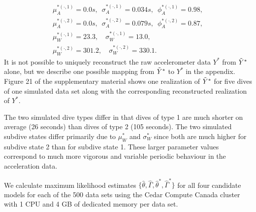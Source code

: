 %
\begin{gather*}
    \mu_A^{*(\cdot,1)} = 0.0 s, \enspace \sigma_A^{*(\cdot,1)} = 0.034s, \enspace \phi_A^{*(\cdot,1)} = 0.98, \\
    \mu_A^{*(\cdot,2)} = 0.0 s, \enspace \sigma_A^{*(\cdot,2)} = 0.079s, \enspace \phi_A^{*(\cdot,2)} = 0.87, \\
    \mu_W^{*(\cdot,1)} = 23.3, \quad \sigma_W^{*(\cdot,1)} = 13.0, \\
    \mu_W^{*(\cdot,2)} = 301.2, \quad \sigma_W^{*(\cdot,2)} = 330.1.
\end{gather*}
%
It is not possible to uniquely reconstruct the raw accelerometer data $Y^*$ from $\tilde{Y}^*$ alone, but we describe one possible mapping from $\tilde{Y}^*$ to $Y^*$ in the appendix. Figure 21 of the supplementary material shows one realization of $\tilde{Y}^*$ for five dives of one simulated data set along with the corresponding reconstructed realization of $Y^*$. 

The two simulated dive types differ in that dives of type 1 are much shorter on average (26 seconds) than dives of type 2 (105 seconds). The two simulated subdive states differ primarily due to $\mu_W^*$ and $\sigma_W^*$ since both are much higher for subdive state 2 than for subdive state 1. These larger parameter values correspond to much more vigorous and variable periodic behaviour in the acceleration data. 

We calculate maximum likelihood estimates $\{\hat \theta, \hat \Gamma, \hat \theta^*, \hat \Gamma^*\}$ for all four candidate models for each of the 500 data sets using the Cedar Compute Canada cluster with 1 CPU and 4 GB of dedicated memory per data set.

